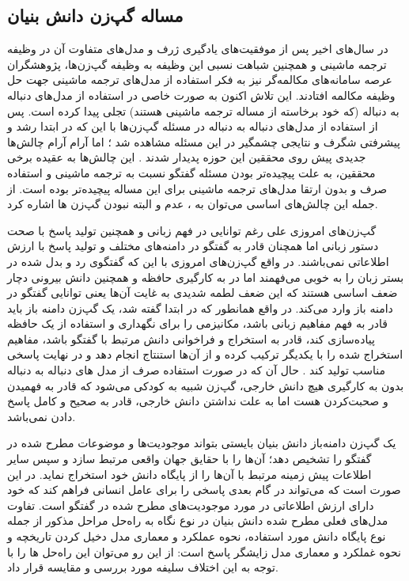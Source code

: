 \subsection{مساله گپ‌زن دانش بنیان}\label{chap1:knowledge_problem}
در سال‌های اخیر پس از موفقیت‌های یادگیری ژرف  و مدل‌های متفاوت آن در وظیفه ترجمه ماشینی و همچنین شباهت نسبی این وظیفه به وظیفه گپ‌زن‌ها، پژوهشگران عرصه سامانه‌های مکالمه‌گر نیز به فکر استفاده از مدل‌های ترجمه ماشینی جهت حل وظیفه مکالمه افتادند. این تلاش اکنون به صورت خاصی در استفاده از مدل‌های دنباله به دنباله (که خود برخاسته از مساله ترجمه ماشینی هستند) تجلی پیدا کرده است. پس از استفاده از مدل‌های دنباله به دنباله در مسئله گپ‌زن‌ها با این که در ابتدا رشد و پیشرفتی شگرف و نتایجی چشمگیر در این مسئله مشاهده شد
؛
اما آرام آرام چالش‌ها جدیدی پیش روی محققین این حوزه پدیدار شدند
\cite{A_Neural_Conversational_Model}.
 این چالش‌ها به عقیده برخی محققین، به علت پیچیده‌تر بودن مسئله گفتگو نسبت به ترجمه ماشینی و استفاده صرف و بدون ارتقا مدل‌های ترجمه ماشینی برای این مساله پیچیده‌تر بوده است. از جمله این چالش‌های اساسی می‌توان به 
، عدم
 و البته 
نبودن گپ‌زن ها اشاره کرد.

گپ‌زن‌های امروزی علی رغم توانایی در فهم زبانی و همچنین تولید پاسخ با صحت دستور زبانی اما همچنان قادر به 
گفتگو در دامنه‌های مختلف و تولید پاسخ با ارزش اطلاعاتی نمی‌باشند. در واقع گپ‌زن‌های امروزی با این که گفتگوی رد و بدل شده در بستر زبان را به خوبی می‌فهمند اما در به کارگیری حافظه و همچنین دانش بیرونی دچار ضعف اساسی هستند که این ضعف لطمه شدیدی به غایت آن‌ها یعنی توانایی گفتگو در دامنه باز وارد می‌کند. در واقع همانطور که در ابتدا گفته شد، یک گپ‌زن دامنه باز باید قادر به فهم مفاهیم زبانی باشد، مکانیزمی را برای نگهداری و استفاده از یک حافظه پیاده‌سازی کند، قادر به استخراج و فراخوانی دانش مرتبط با گفتگو باشد، مفاهیم استخراج‌ شده را با یکدیگر ترکیب کرده و از آن‌ها استنتاج انجام دهد و در نهایت پاسخی مناسب تولید کند
\cite{wizard}
.
حال آن که در صورت استفاده صرف از مدل های دنباله به دنباله بدون به کارگیری هیچ دانش خارجی، گپ‌زن شبیه به کودکی می‌شود که قادر به فهمیدن و صحبت‌کردن هست اما به علت نداشتن دانش خارجی، قادر به صحیح و کامل پاسخ دادن نمی‌باشد.

یک گپ‌زن دامنه‌باز دانش بنیان بایستی بتواند موجودیت‌ها و موضوعات مطرح شده در گفتگو را تشخیص دهد؛ آن‌ها را با حقایق جهان واقعی مرتبط سازد و سپس سایر اطلاعات 
پیش زمینه مرتبط با آن‌ها را از پایگاه دانش خود استخراج نماید. 
در این صورت است که می‌تواند در گام بعدی پاسخی را برای عامل انسانی فراهم کند که خود دارای ارزش اطلاعاتی در مورد موجودیت‌های مطرح شده در گفتگو است. 
تفاوت مدل‌های فعلی مطرح شده دانش بنیان در نوع نگاه به راه‌حل مراحل مذکور 
از جمله نوع پایگاه دانش مورد استفاده، نحوه عملکرد و معماری مدل دخیل کردن تاریخچه و نحوه غملکرد و معماری مدل زایشگر پاسخ
است: از این رو می‌توان این راه‌حل ها را با توجه به این اختلاف سلیفه مورد بررسی و مقایسه قرار داد. 

